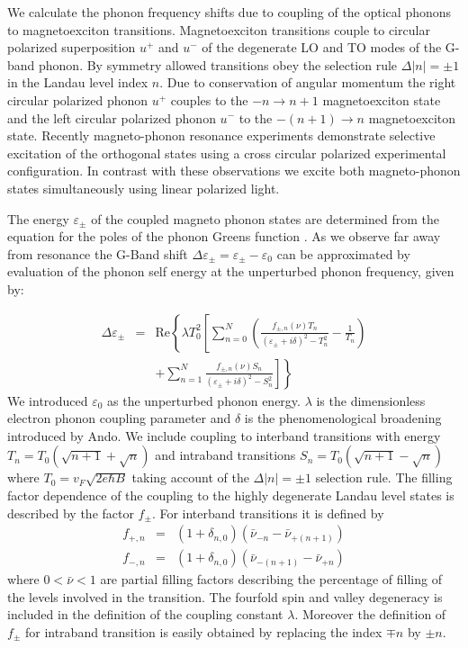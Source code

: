 \documentclass[prl,aps,superscriptaddress,showpacs,reprint]{revtex4-1}
\begin{document}
We calculate the phonon frequency shifts due to coupling of the optical phonons to magnetoexciton transitions. 
Magnetoexciton transitions couple to circular polarized superposition $u^+$ and $u^-$ of the degenerate LO and TO modes of the G-band phonon. By symmetry allowed transitions obey the selection rule  $\Delta\left|n\right|=\pm 1$ in the Landau level index $n$. Due to conservation of angular momentum the right circular polarized phonon $u^+$ couples to the $-n\rightarrow n+1$ magnetoexciton state and the left circular polarized phonon $u^-$ to the $-(n+1)\rightarrow n$ magnetoexciton state. Recently magneto-phonon resonance experiments demonstrate selective excitation of the orthogonal states using a cross circular polarized experimental configuration\cite{PhysRevLett.110.227402,kossacki2012circular}.
In contrast with these observations we excite both magneto-phonon states simultaneously using linear polarized light. 

The energy $\varepsilon_{\pm}$ of the coupled magneto phonon states are determined from the equation for the poles of the phonon Greens function \cite{goerbig2007filling,ando2007magnetic,kossacki2012circular}. As we observe far away from resonance the G-Band shift $\Delta\varepsilon_{\pm} = \varepsilon_{\pm} - \varepsilon_0$ can be approximated by evaluation of the phonon self energy at the unperturbed phonon frequency, given by:

\begin{eqnarray}
\label{greens}
\Delta\varepsilon_{\pm} &=& \mathrm{Re}\left\lbrace \lambda T_0^2 \left[ \sum_{n=0}^N\left(\frac{f_{\pm,n}\left(\nu\right) T_n}{\left(\varepsilon_{\pm}+i\delta\right)^2-T_n^2}-\frac{1}{T_n}\right)\right.\right.\nonumber \\
& &\left.\left. +\sum_{n=1}^{N}\frac{f_{\pm,n}\left(\nu\right) S_n}{\left(\varepsilon_{\pm}+i\delta\right)^2-S_n^2}\right]\right\rbrace
\end{eqnarray}
We introduced $\varepsilon_0$ as the unperturbed phonon energy. $\lambda$ is the dimensionless electron phonon coupling parameter and $\delta$ is the phenomenological broadening introduced by Ando\cite{ando2007magnetic}. We include coupling to interband transitions with energy $T_n=T_0\left(\sqrt{n+1}+\sqrt{n}\right)$ and intraband transitions $S_n=T_0\left(\sqrt{n+1}-\sqrt{n}\right)$ where $T_0=v_F\sqrt{2e\hbar B}$ taking account of the $\Delta\left|n\right|=\pm 1$ selection rule. The filling factor dependence of the coupling to the highly degenerate Landau level states is described by the factor $f_{\pm}$. For interband transitions it is defined by
\begin{eqnarray}
\label{fterm}
f_{+,n}&=&(1+\delta_{n,0})(\bar{\nu}_{-n}-\bar{\nu}_{+(n+1)})\nonumber\\
f_{-,n}&=&(1+\delta_{n,0})(\bar{\nu}_{-(n+1)}-\bar{\nu}_{+n})
\end{eqnarray}
where $0<\bar{\nu}<1$ are partial filling factors describing the percentage of filling of the levels involved in the transition. The fourfold spin and valley degeneracy is included in the definition of the coupling constant $\lambda$. Moreover the definition of $f_{\pm}$ for intraband transition is easily obtained by replacing the index $\mp n$ by $\pm n$. 
\end{document}
